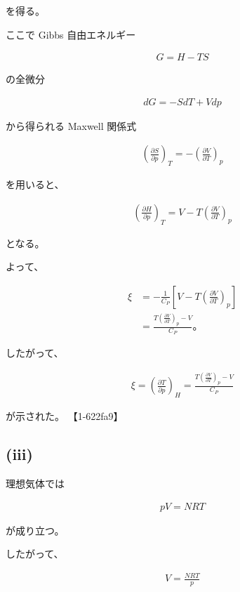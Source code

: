 \documentclass[platex,dvipdfmx,a4paper]{jsarticle}
\begin{document}
を得る。

ここで Gibbs 自由エネルギー

\begin{align*}
G=H-TS
\end{align*}

の全微分

\begin{align*}
dG
=
-SdT+Vdp
\end{align*}

から得られる Maxwell 関係式

\begin{align*}
\left(
\frac{\partial S}{\partial p}
\right)_T
=
-
\left(
\frac{\partial V}{\partial T}
\right)_p
\end{align*}

を用いると、

\begin{align*}
\left(
\frac{\partial H}{\partial p}
\right)_T
=
V-T
\left(
\frac{\partial V}{\partial T}
\right)_p
\end{align*}

となる。

よって、

\begin{align*}
\xi
&=
-\frac1{C_P}
\left[
V-T
\left(
\frac{\partial V}{\partial T}
\right)_p
\right]
\\
&=
\frac{
T
\left(
\frac{\partial V}{\partial T}
\right)_p
-V
}{
C_P
}。
\end{align*}

したがって、

\begin{align*}
\boxed{
\xi
=
\left(
\frac{\partial T}{\partial p}
\right)_H
=
\frac{
T
\left(
\frac{\partial V}{\partial T}
\right)_p
-V
}{
C_P
}
}
\end{align*}

が示された。 【1-622fa9】

\subsection{(iii)}

理想気体では

\begin{align*}
pV=NRT
\end{align*}

が成り立つ。

したがって、

\begin{align*}
V
=
\frac{NRT}{p}
\end{align*}
\end{document}
